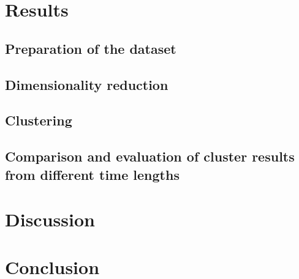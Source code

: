 \section{Results}
\label{section:Experiment}


  \subsection{Preparation of the dataset}
  \label{section:ExperimentPreparationDataSet}
  

  \subsection{Dimensionality reduction}
  \label{section:DimensionalityReduction}
  

  \subsection{Clustering}
  \label{section:ExperimentClustering}
  

  \subsection{Comparison and evaluation of cluster results from different time lengths}
  \label{section:ExperimentComparisonTimeLengths}
  
  

\section{Discussion}
\label{section:Discussion}



\section{Conclusion}
\label{section:Conclusion}


